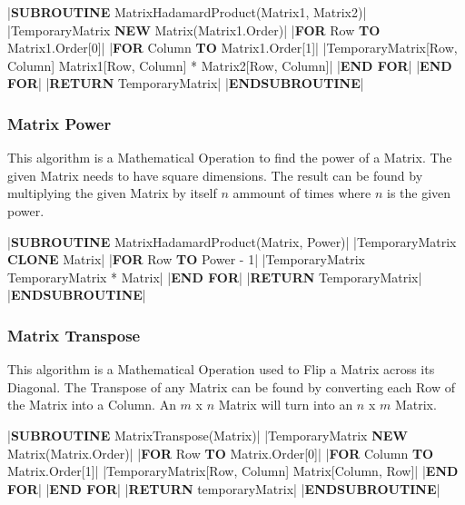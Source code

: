 \begin{flushleft}
                \vspace{0.2cm}
                \begin{pseudocode}
|\textbf{SUBROUTINE} MatrixHadamardProduct(Matrix1, Matrix2)|
    |TemporaryMatrix \leftarrow \textbf{NEW} Matrix(Matrix1.Order)|
    |\textbf{FOR} Row  \textbf{TO} Matrix1.Order[0]|
        |\textbf{FOR} Column  \textbf{TO} Matrix1.Order[1]|
            |TemporaryMatrix[Row, Column] \leftarrow Matrix1[Row, Column] * Matrix2[Row, Column]|
        |\textbf{END FOR}|
    |\textbf{END FOR}|
    |\textbf{RETURN} TemporaryMatrix|
|\textbf{ENDSUBROUTINE}|
                \end{pseudocode}   

                \vspace{0.5cm}
            \subsubsection{Matrix Power}
                This algorithm is a Mathematical Operation to find the power of a Matrix. The given Matrix needs to have square dimensions.
                The result can be found by multiplying the given Matrix by itself $n$ ammount of times where $n$ is the given power.
                
                \vspace{0.2cm}
                \begin{pseudocode}
|\textbf{SUBROUTINE} MatrixHadamardProduct(Matrix, Power)|
    |TemporaryMatrix \leftarrow \textbf{CLONE} Matrix|
    |\textbf{FOR} Row  \textbf{TO} Power - 1|
        |TemporaryMatrix \leftarrow TemporaryMatrix * Matrix|
    |\textbf{END FOR}|
    |\textbf{RETURN} TemporaryMatrix|
|\textbf{ENDSUBROUTINE}|
                \end{pseudocode}  

                \vspace{0.5cm}
            \subsubsection{Matrix Transpose}
                This algorithm is a Mathematical Operation used to Flip a Matrix across its Diagonal. The Transpose of any Matrix
                can be found by converting each Row of the Matrix into a Column. An $m$ x $n$ Matrix will turn into an $n$ x $m$ Matrix.

                \vspace{0.2cm}
                \begin{pseudocode}
|\textbf{SUBROUTINE} MatrixTranspose(Matrix)|
    |TemporaryMatrix \leftarrow \textbf{NEW} Matrix(Matrix.Order)|
    |\textbf{FOR} Row  \textbf{TO} Matrix.Order[0]|
        |\textbf{FOR} Column  \textbf{TO} Matrix.Order[1]|
            |TemporaryMatrix[Row, Column] \leftarrow Matrix[Column, Row]|
        |\textbf{END FOR}|
    |\textbf{END FOR}|
    |\textbf{RETURN} temporaryMatrix|
|\textbf{ENDSUBROUTINE}|
                \end{pseudocode}


\end{flushleft}
